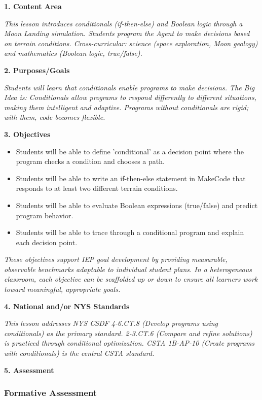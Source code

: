 \documentclass[11pt,letterpaper]{article}
\begin{document}
\textbf{1. Content Area}

\textit{This lesson introduces conditionals (if-then-else) and Boolean logic through a Moon Landing simulation. Students program the Agent to make decisions based on terrain conditions. Cross-curricular: science (space exploration, Moon geology) and mathematics (Boolean logic, true/false).}

\textbf{2. Purposes/Goals}

\textit{Students will learn that conditionals enable programs to make decisions. The Big Idea is: Conditionals allow programs to respond differently to different situations, making them intelligent and adaptive. Programs without conditionals are rigid; with them, code becomes flexible.}

\textbf{3. Objectives}

\begin{itemize}
  \item Students will be able to define 'conditional' as a decision point where the program checks a condition and chooses a path.

  \item Students will be able to write an if-then-else statement in MakeCode that responds to at least two different terrain conditions.

  \item Students will be able to evaluate Boolean expressions (true/false) and predict program behavior.

  \item Students will be able to trace through a conditional program and explain each decision point.
\end{itemize}

\textit{These objectives support IEP goal development by providing measurable, observable benchmarks adaptable to individual student plans. In a heterogeneous classroom, each objective can be scaffolded up or down to ensure all learners work toward meaningful, appropriate goals.}

\textbf{4. National and/or NYS Standards}

\textit{This lesson addresses NYS CSDF 4-6.CT.8 (Develop programs using conditionals) as the primary standard. 2-3.CT.6 (Compare and refine solutions) is practiced through conditional optimization. CSTA 1B-AP-10 (Create programs with conditionals) is the central CSTA standard.}

\newpage
\textbf{5. Assessment}

\subsubsection{Formative Assessment}
\end{document}
